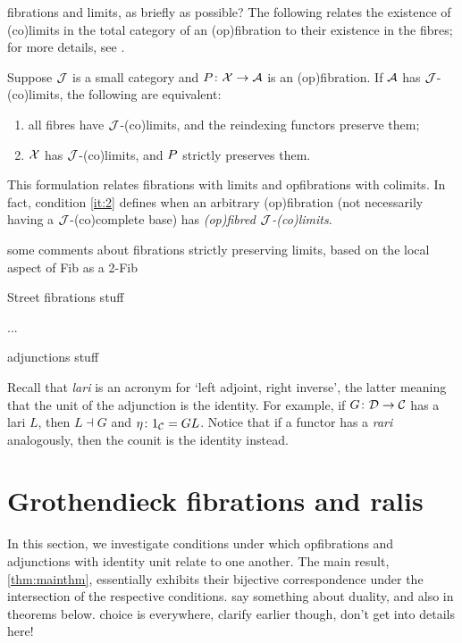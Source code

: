 \documentclass{amsart}
\begin{document}
{\chris fibrations and limits, as briefly as possible?}
The following relates the existence of (co)limits in the total category of an (op)fibration to their existence in the fibres; for more details, see \cite{hermidaphd}.

\begin{lem}\label{lem:fibrewiselimits}
Suppose $\ca{J}$ is a small category and $\P\colon\X\to\A$ is an (op)fibration. If $\A$ has $\ca{J}$-(co)limits,
the following are equivalent:
\begin{enumerate}
 \item all fibres have $\ca{J}$-(co)limits, and the reindexing functors preserve them;
 \item $\X$ has $\ca{J}$-(co)limits, and $\P$ strictly preserves them.\label{it:2}
\end{enumerate}
\end{lem}
This formulation relates fibrations with limits and opfibrations with colimits.
In fact, condition \ref{it:2} defines when an arbitrary (op)fibration (not necessarily having a $\ca{J}$-(co)complete base) has \emph{(op)fibred $\ca{J}$-(co)limits}.

{\chris some comments about fibrations strictly preserving limits, based on the local aspect of Fib as a 2-Fib}
\cite{Fib2Fib}

{\chris Street fibrations stuff}

...

{\chris adjunctions stuff}

Recall that \emph{lari} is an acronym for `left adjoint, right inverse', the latter meaning that the unit of
the adjunction is the identity. For example, if $G\colon\ca{D}\to\ca{C}$ has a lari $L$, then $L\dashv G$ and
$\eta\colon1_\ca{C}=GL$. Notice that if a functor has a \emph{rari} analogously, then the counit is the identity instead.

\section{Grothendieck fibrations and ralis}

In this section, we investigate conditions under which opfibrations and adjunctions with identity unit relate to one another. The main result, \cref{thm:mainthm}, essentially exhibits their bijective correspondence under the intersection of the respective conditions. {\chris say something about duality, and also in theorems below.} {\chris choice is everywhere, clarify earlier though, don't get into details here!}
\end{document}
